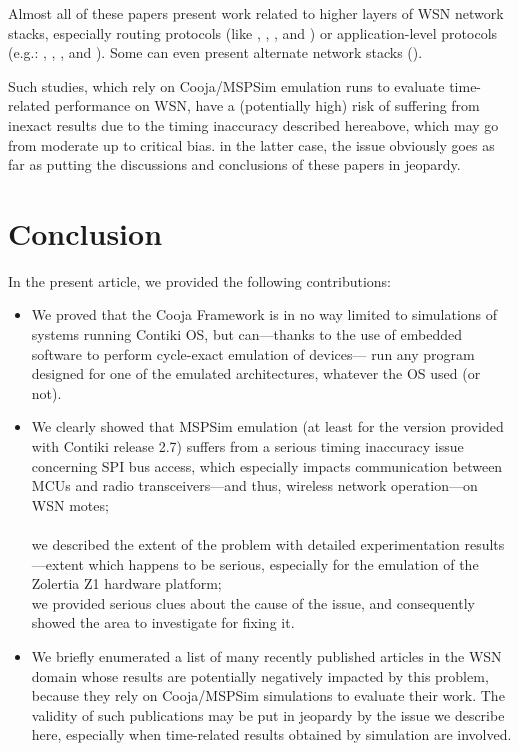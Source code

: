 \documentclass[10pt,emptycopyrightspace]{ewsn-proc}
\begin{document}
\smallskip

Almost all of these papers present work related to higher layers of
WSN network stacks, especially routing protocols (like
\cite{Constrain-Routing-Trees-2014},
\cite{Co-RPL-2014}, \cite{IETF-Routing-WSN-2014},
and \cite{Trickle-L2-2014})
or application-level protocols (e.g.: \cite{DINAS-2014},
\cite{Efficient-Distrib-Svc-Discovery-2014},
\cite{Visual-Sensor-Networks-2014}, and \cite{Key-Mgmt-2015}).
Some can even present alternate network stacks (\cite{TinySDN-2014}).

\bigskip

Such studies, which rely on Cooja/MSPSim emulation runs to evaluate
time-related performance on WSN, have a (potentially high) risk of
suffering from inexact results due to the timing inaccuracy described
hereabove, which may go from moderate up to critical bias.
in the latter case, the issue obviously goes as far as putting
the discussions and conclusions of these papers in jeopardy.

\newpage


\section{Conclusion}
\label{conclusion}

In the present article, we provided the following contributions:

\medskip

\begin{itemize}
\item We proved that the Cooja Framework is in no way limited to simulations
of systems running Contiki OS, but can---thanks to the use of embedded
software to perform cycle-exact emulation of devices--- run any program
designed for one of the emulated architectures, whatever the OS used
(or not).
\ \\
\item We clearly showed that MSPSim emulation (at least for the version
provided with Contiki release 2.7) suffers from a serious timing
inaccuracy issue concerning SPI bus access, which especially impacts
communication between MCUs and radio transceivers---and thus, wireless
network operation---on WSN motes;\\
\ \\
we described the extent of the problem with detailed experimentation
results---extent which happens to be serious, especially for the emulation
of the Zolertia Z1 hardware platform;\\
we provided serious clues about the cause of the issue, and
consequently showed the area to investigate for fixing it.
\item We briefly enumerated a list of many recently published articles in the
WSN domain whose results are potentially negatively impacted by this problem,
because they rely on Cooja/MSPSim simulations to evaluate their work.
The validity of such publications may be put in jeopardy by the
issue we describe here, especially when time-related results
obtained by simulation are involved.
\end{itemize}
\end{document}
